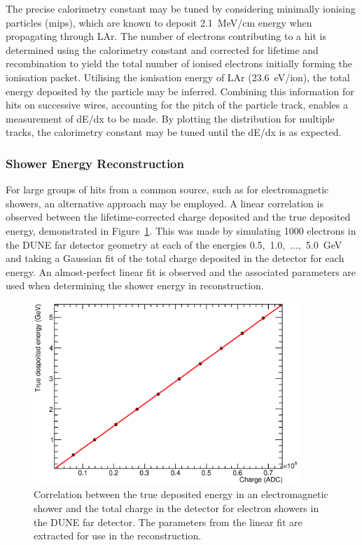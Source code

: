 The precise calorimetry constant may be tuned by considering minimally ionising particles (mips), which are known to deposit 2.1~MeV/cm energy when propagating through LAr.  The number of electrons contributing to a hit is determined using the calorimetry constant and corrected for lifetime and recombination to yield the total number of ionised electrons initially forming the ionisation packet.  Utilising the ionisation energy of LAr (23.6~eV/ion), the total energy deposited by the particle may be inferred.  Combining this information for hits on successive wires, accounting for the pitch of the particle track, enables a measurement of dE/dx to be made.  By plotting the distribution for multiple tracks, the calorimetry constant may be tuned until the dE/dx is as expected.

\subsubsection{Shower Energy Reconstruction}\label{sec:ShowerEnergy}

For large groups of hits from a common source, such as for electromagnetic showers, an alternative approach may be employed.  A linear correlation is observed between the lifetime-corrected charge deposited and the true deposited energy, demonstrated in Figure~\ref{fig:ShowerEnergyConversion}.  This was made by simulating 1000 electrons in the DUNE far detector geometry at each of the energies 0.5,~1.0,~...,~5.0~GeV and taking a Gaussian fit of the total charge deposited in the detector for each energy.  An almost-perfect linear fit is observed and the associated parameters are used when determining the shower energy in reconstruction.

\begin{figure}
  \centering
  \includegraphics[width=10cm]{ShowerEnergyConversionFD.eps}
  \caption[Correlation between the true deposited energy in an electromagnetic shower and the total charge in the detector for electron showers in the DUNE far detector.]{Correlation between the true deposited energy in an electromagnetic shower and the total charge in the detector for electron showers in the DUNE far detector.  The parameters from the linear fit are extracted for use in the reconstruction.}
  \label{fig:ShowerEnergyConversion}
\end{figure}


